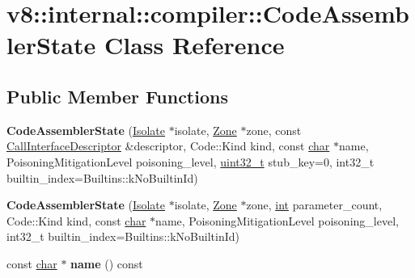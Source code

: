 \hypertarget{classv8_1_1internal_1_1compiler_1_1CodeAssemblerState}{}\section{v8\+:\+:internal\+:\+:compiler\+:\+:Code\+Assembler\+State Class Reference}
\label{classv8_1_1internal_1_1compiler_1_1CodeAssemblerState}
\subsection*{Public Member Functions}
\begin{DoxyCompactItemize}
\item 
\mbox{\label{classv8_1_1internal_1_1compiler_1_1CodeAssemblerState_ac53f85bf2e644435bcdb507f860ac4b3}} 
{\bfseries Code\+Assembler\+State} (\mbox{\hyperlink{classv8_1_1internal_1_1Isolate}{Isolate}} $\ast$isolate, \mbox{\hyperlink{classv8_1_1internal_1_1Zone}{Zone}} $\ast$zone, const \mbox{\hyperlink{classv8_1_1internal_1_1CallInterfaceDescriptor}{Call\+Interface\+Descriptor}} \&descriptor, Code\+::\+Kind kind, const \mbox{\hyperlink{classchar}{char}} $\ast$name, Poisoning\+Mitigation\+Level poisoning\+\_\+level, \mbox{\hyperlink{classuint32__t}{uint32\+\_\+t}} stub\+\_\+key=0, int32\+\_\+t builtin\+\_\+index=Builtins\+::k\+No\+Builtin\+Id)
\item 
\mbox{\label{classv8_1_1internal_1_1compiler_1_1CodeAssemblerState_ad68d2f060e40d8cbab72d0f5b673064a}} 
{\bfseries Code\+Assembler\+State} (\mbox{\hyperlink{classv8_1_1internal_1_1Isolate}{Isolate}} $\ast$isolate, \mbox{\hyperlink{classv8_1_1internal_1_1Zone}{Zone}} $\ast$zone, \mbox{\hyperlink{classint}{int}} parameter\+\_\+count, Code\+::\+Kind kind, const \mbox{\hyperlink{classchar}{char}} $\ast$name, Poisoning\+Mitigation\+Level poisoning\+\_\+level, int32\+\_\+t builtin\+\_\+index=Builtins\+::k\+No\+Builtin\+Id)
\item 
\mbox{\label{classv8_1_1internal_1_1compiler_1_1CodeAssemblerState_a4b78522c7ac390cf4c3d02c2ed86eb50}} 
const \mbox{\hyperlink{classchar}{char}} $\ast$ {\bfseries name} () const
\item 

\end{DoxyCompactItemize}
